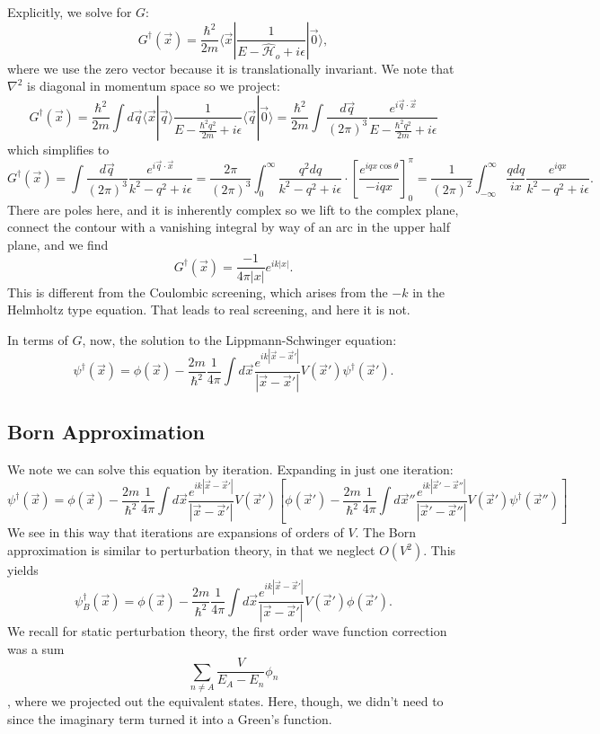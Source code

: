 \documentclass[fontsize=12pt]{scrartcl}
\newcommand{\la}{\langle}
\newcommand{\ra}{\rangle}
\newcommand{\Ham}{\hat{\mathcal{H}}}
\begin{document}
Explicitly, we solve for $G$: $$G^\dagger(\vec{x})=\frac{\hbar^2}{2m} \la \vec{x} | \frac{1}{E-\Ham_o+i\epsilon}|\vec{0}\ra,$$ where we use the zero vector because it is translationally invariant. We note that $\nabla^2$ is diagonal in momentum space so we project: $$G^\dagger(\vec{x}) = \frac{\hbar^2}{2m} \int d\vec{q} \la\vec{x}|\vec{q}\ra \frac{1}{E-\frac{\hbar^2q^2}{2m} + i\epsilon} \la \vec{q}|\vec{0}\ra = \frac{\hbar^2}{2m}\int \frac{d\vec{q}}{(2\pi)^3} \frac{e^{i\vec{q}\cdot\vec{x}}}{E-\frac{\hbar^2q^2}{2m} + i\epsilon} $$ which simplifies to $$G^\dagger(\vec{x}) = \int \frac{d\vec{q}}{(2\pi)^3} \frac{e^{i\vec{q}\cdot\vec{x}}}{k^2-q^2+i\epsilon} = \frac{2\pi}{(2\pi)^3} \int_0^\infty \frac{q^2dq}{k^2-q^2+i\epsilon}\cdot \left[\frac{e^{iqx\cos\theta}}{-iqx}\right]_0^\pi= \frac{1}{(2\pi)^2}\int_{-\infty}^{\infty} \frac{qdq}{ix}\frac{e^{iqx}}{k^2-q^2+i\epsilon}.$$ There are poles here, and it is inherently complex so we lift to the complex plane, connect the contour with a vanishing integral by way of an arc in the upper half plane, and we find $$G^\dagger(\vec{x}) = \frac{-1}{4\pi|x|}e^{ik|x|}.$$ This is different from the Coulombic screening, which arises from the $-k$ in the Helmholtz type equation. That leads to real screening, and here it is not.

In terms of $G$, now, the solution to the Lippmann-Schwinger equation: $$\psi^\dagger(\vec{x}) = \phi(\vec{x}) -\frac{2m}{\hbar^2}\frac{1}{4\pi} \int d\vec{x} \frac{e^{ik|\vec{x}-\vec{x}'|}}{|\vec{x}-\vec{x}'|} V(\vec{x}')\psi^\dagger(\vec{x}').$$ 

\subsection{Born Approximation}

We note we can solve this equation by iteration. Expanding in just one iteration: $$\psi^\dagger(\vec{x}) = \phi(\vec{x}) -\frac{2m}{\hbar^2}\frac{1}{4\pi} \int d\vec{x} \frac{e^{ik|\vec{x}-\vec{x}'|}}{|\vec{x}-\vec{x}'|} V(\vec{x}')\left[\phi(\vec{x}')-\frac{2m}{\hbar^2}\frac{1}{4\pi}\int d\vec{x}'' \frac{e^{ik|\vec{x}'-\vec{x}''|}}{|\vec{x}'-\vec{x}''|}V(\vec{x}')\psi^\dagger(\vec{x}'')\right]$$ We see in this way that iterations are expansions of orders of $V$. The Born approximation is similar to perturbation theory, in that we neglect $O(V^2)$. This yields $$\psi^\dagger_B(\vec{x})= \phi(\vec{x}) -\frac{2m}{\hbar^2}\frac{1}{4\pi} \int d\vec{x} \frac{e^{ik|\vec{x}-\vec{x}'|}}{|\vec{x}-\vec{x}'|} V(\vec{x}')\phi(\vec{x}').$$ We recall for static perturbation theory, the first order wave function correction was a sum $$\sum_{n\neq A} \frac{V}{E_A-E_n}\phi_n$$, where we projected out the equivalent states. Here, though, we didn't need to since the imaginary term turned it into a Green's function.
\end{document}
